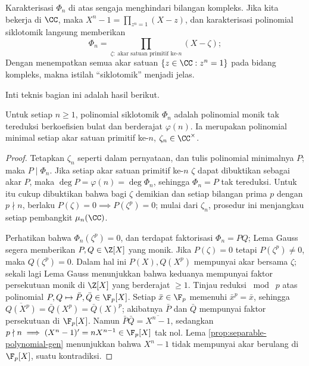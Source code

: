 Karakterisasi $\Phi_n$ di atas sengaja menghindari bilangan kompleks. Jika kita bekerja di $\CC$, maka $X^n-1=\prod_{z^n=1}(X-z)$, dan karakterisasi polinomial siklotomik langsung memberikan
\[ \Phi_n = \prod_{\zeta:\; \text{akar satuan primitif ke-$n$}} (X-\zeta); \]
Dengan menempatkan semua akar satuan $\{z\in\CC:z^n=1\}$ pada bidang kompleks, makna istilah ``siklotomik'' menjadi jelas.

Inti teknis bagian ini adalah hasil berikut.
\begin{theorem}
	Untuk setiap $n\geq1$, polinomial siklotomik $\Phi_n$ adalah polinomial monik tak tereduksi berkoefisien bulat dan berderajat $\varphi(n)$. Ia merupakan polinomial minimal setiap akar satuan primitif ke-$n$, $\zeta_n\in\CC^\times$.
\end{theorem}
\begin{proof}
	Tetapkan $\zeta_n$ seperti dalam pernyataan, dan tulis polinomial minimalnya $P$; maka $P\mid\Phi_n$. Jika setiap akar satuan primitif ke-$n$ $\zeta$ dapat dibuktikan sebagai akar $P$, maka $\deg P=\varphi(n)=\deg\Phi_n$, sehingga $\Phi_n=P$ tak tereduksi. Untuk itu cukup dibuktikan bahwa bagi $\zeta$ demikian dan setiap bilangan prima $p$ dengan $p\nmid n$, berlaku $P(\zeta)=0\implies P(\zeta^p)=0$; mulai dari $\zeta_n$, prosedur ini menjangkau setiap pembangkit $\mu_n(\CC)$.
	
	Perhatikan bahwa $\Phi_n(\zeta^p)=0$, dan terdapat faktorisasi $\Phi_n = PQ$; Lema Gauss segera memberikan $P,Q \in \Z[X]$ yang monik. Jika $P(\zeta)=0$ tetapi $P(\zeta^p) \neq 0$, maka $Q(\zeta^p)=0$. Dalam hal ini $P(X), Q(X^p)$ mempunyai akar bersama $\zeta$; sekali lagi Lema Gauss menunjukkan bahwa keduanya mempunyai faktor persekutuan monik di $\Z[X]$ yang berderajat $\geq 1$. Tinjau reduksi $\bmod \; p$ atas polinomial $P,Q \mapsto \bar{P},\bar{Q} \in \F_p[X]$. Setiap $\bar{x} \in \F_p$ memenuhi $\bar{x}^p = \bar{x}$, sehingga $\overline{Q(X^p)} = \bar{Q}(X^p) = \bar{Q}(X)^p$; akibatnya $\bar{P}$ dan $\bar{Q}$ mempunyai faktor persekutuan di $\F_p[X]$. Namun $\bar{P}\bar{Q} = \overline{X^n-1}$, sedangkan $p \nmid n \implies (X^n-1)' = nX^{n-1} \in \F_p[X]$ tak nol. Lema \ref{prop:separable-polynomial-gen} menunjukkan bahwa $X^n-1$ tidak mempunyai akar berulang di $\F_p[X]$, suatu kontradiksi.
\end{proof}

